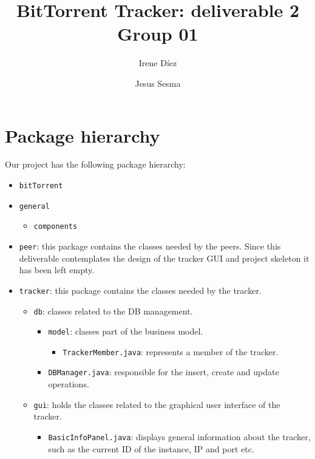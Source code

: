 \documentclass[twoside,a4paper,10pt]{article}
\title{BitTorrent Tracker: deliverable 2\\
  Group 01}
\author{Irene Díez \and Jesus Sesma}
\begin{document}
\date{}
\maketitle

\section{Package hierarchy}

Our project has the following package hierarchy:

\begin{itemize}
\item \texttt{bitTorrent}
  \begin{itemize}
  \end{itemize}
\item \texttt{general}
  \begin{itemize}
  \item \texttt{components}
  \end{itemize}
\item \texttt{peer}: this package contains the classes needed by the peers. 
  Since this deliverable contemplates the design of the tracker GUI and
  project skeleton it has been left empty.
\item \texttt{tracker}: this package contains the classes needed by the tracker.
  \begin{itemize}
  \item \texttt{db}: classes related to the DB management.
    \begin{itemize}
    \item \texttt{model}: classes part of the business model.
      \begin{itemize}
      \item \texttt{TrackerMember.java}: represents a member of the tracker.
      \end{itemize}
    \item \texttt{DBManager.java}: responsible for the insert, create and
      update operations.
    \end{itemize}
  \item \texttt{gui}: holds the classes related to the graphical user interface
    of the tracker.
    \begin{itemize}
    \item \texttt{BasicInfoPanel.java}: displays general information about
      the tracker, such as the current ID of the instance, IP and port etc.

\end{itemize}
\end{itemize}
\end{itemize}
\end{document}
